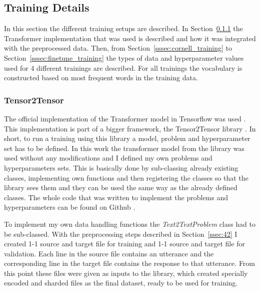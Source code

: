 \documentclass[12pt]{article}
\begin{document}
\subsection{Training Details} \label{ssec:43}
In this section the different training setups are described. In Section~\ref{sssec:t2t} the Transformer implementation that was used is described and how it was integrated with the preprocessed data. Then, from Section~\ref{sssec:cornell_training} to Section~\ref{sssec:finetune_training} the types of data and hyperparameter values used for 4 different trainings are described. For all trainings the vocabulary is constructed based on most frequent words in the training data.

\subsubsection{Tensor2Tensor} \label{sssec:t2t}
The official implementation of the Transformer model in Tensorflow was used \cite{Tensorflow}. This implementation is part of a bigger framework, the Tensor2Tensor library \cite{t2t}. In short, to run a training using this library a model, problem and hyperparameter set has to be defined. In this work the transformer model from the library was used without any modifications and I defined my own problems and hyperparameters sets. This is basically done by sub-classing already existing classes, implementing own functions and then registering the classes so that the library sees them and they can be used the same way as the already defined classes. The whole code that was written to implement the problems and hyperparameters can be found on Github \cite{seq2seqchatbots}.

To implement my own data handling functions the \textit{Text2TextProblem} class had to be sub-classed. With the preprocessing steps described in Section~\ref{ssec:42} I created 1-1 source and target file for training and 1-1 source and target file for validation. Each line in the source file contains an utterance and the corresponding line in the target file contains the response to that utterance. From this point these files were given as inputs to the library, which created specially encoded and sharded files as the final dataset, ready to be used for training.
\end{document}
